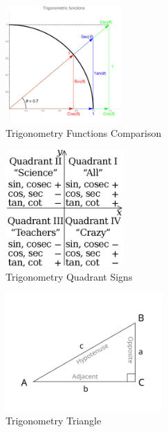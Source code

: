 \begin{table}[H]
    \centering
    \begin{minipage}[t]{0.3\linewidth}
        \begin{figure}[H]
            \centering
            \includegraphics[height=4.5cm]{Pictures/maths/TrigFunctions.jpg}
            \caption{Trigonometry Functions Comparison}
        \end{figure}
    \end{minipage}
    \hfill
    \begin{minipage}[t]{0.3\linewidth}
        \begin{figure}[H]
            \centering
            \includegraphics[height=4.5cm]{Pictures/maths/Trigonometric_function_quadrant_sign.png}
            \caption{Trigonometry Quadrant Signs}
        \end{figure}
    \end{minipage}
    \begin{minipage}[t]{0.3\linewidth}
        \begin{figure}[H]
            \centering
            \includegraphics[height=4.5cm]{Pictures/maths/TrigonometryTriangle.jpg}
            \caption{Trigonometry Triangle}
        \end{figure}        
    \end{minipage}
\end{table}

